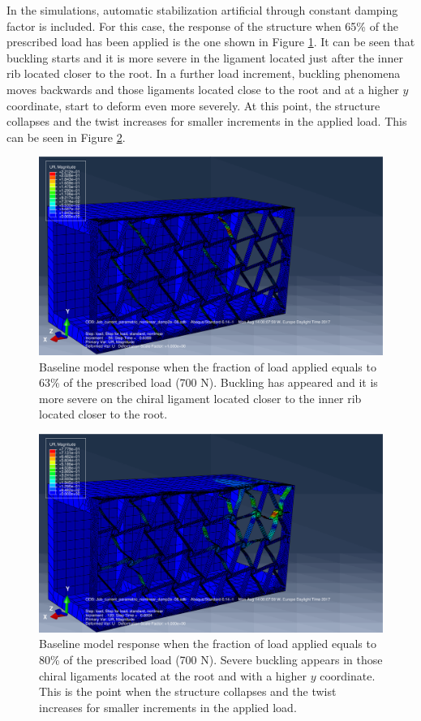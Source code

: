   In the simulations, automatic stabilization artificial through constant damping factor is included. For this case, the response of the structure when 65\% of the prescribed load has been applied is the one shown in Figure \ref{fig:1-UR}. It can be seen that buckling starts and it is more severe in the ligament located just after the inner rib located closer to the root. In a further load increment, buckling phenomena moves backwards and those ligaments located close to the root and at a higher $y$ coordinate, start to deform even more severely. At this point, the structure collapses and the twist increases for smaller increments in the applied load. This can be seen in Figure \ref{fig:2-UR}.

  \begin{figure}[!htpb] %
    \centering
    \includegraphics[width=0.8 \textwidth]{../figures/result-sim/1-UR}
    \caption[Baseline model response when the fraction of load applied equals to 63\% of the prescribed load (700 N)]{Baseline model response when the fraction of load applied equals to 63\% of the prescribed load (700 N). Buckling has appeared and it is more severe on the chiral ligament located closer to the inner rib located closer to the root.}\label{fig:1-UR}
  \end{figure}

  \begin{figure}[!htpb] %
    \centering
    \includegraphics[width=0.8 \textwidth]{../figures/result-sim/2-UR}
    \caption[Baseline model response when the fraction of load applied equals to 80\% of the prescribed load (700 N)]{Baseline model response when the fraction of load applied equals to 80\% of the prescribed load (700 N). Severe buckling appears in those chiral ligaments located at the root and with a higher $y$ coordinate. This is the point when the structure collapses and the twist increases for smaller increments in the applied load.}\label{fig:2-UR}
  \end{figure}

